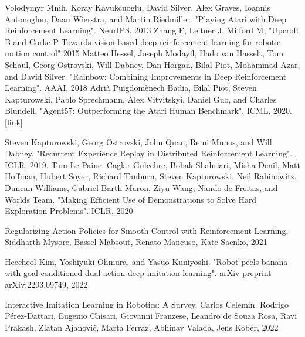 \documentclass[a4j, twocolumn, 10pt,pdflatex,ja=standard]{bxjsarticle}
\begin{document}
\begin{thebibliography}{99H}
 Volodymyr Mnih, Koray Kavukcuoglu, David Silver, Alex Graves, Ioannis Antonoglou, Daan Wierstra, and Martin Riedmiller. "Playing Atari with Deep Reinforcement Learning". NeurIPS, 2013
Zhang F, Leitner J, Milford M, "Upcroft B and Corke P Towards vision-based deep reinforcement learning for robotic motion control" 2015
 Matteo Hessel, Joseph Modayil, Hado van Hasselt, Tom Schaul, Georg Ostrovski, Will Dabney, Dan Horgan, Bilal Piot, Mohammad Azar, and David Silver. "Rainbow: Combining Improvements in Deep Reinforcement Learning". AAAI, 2018
 Adrià Puigdomènech Badia, Bilal Piot, Steven Kapturowski, Pablo Sprechmann, Alex Vitvitskyi, Daniel Guo, and Charles Blundell. "Agent57: Outperforming the Atari Human Benchmark". ICML, 2020. [link]

 Steven Kapturowski, Georg Ostrovski, John Quan, Remi Munos, and Will Dabney. "Recurrent Experience Replay in Distributed Reinforcement Learning". ICLR, 2019.
 Tom Le Paine, Caglar Gulcehre, Bobak Shahriari, Misha Denil, Matt Hoffman, Hubert Soyer, Richard Tanburn, Steven Kapturowski, Neil Rabinowitz, Duncan Williams, Gabriel Barth-Maron, Ziyu Wang, Nando de Freitas, and Worlds Team. "Making Efficient Use of Demonstrations to Solve Hard Exploration Problems". ICLR, 2020


 Regularizing Action Policies for Smooth Control with Reinforcement Learning, Siddharth Mysore, Bassel Mabsout, Renato Mancuso, Kate Saenko, 2021

 Heecheol Kim, Yoshiyuki Ohmura, and Yasuo Kuniyoshi. "Robot peels banana with goal-conditioned dual-action deep imitation learning". arXiv preprint arXiv:2203.09749, 2022.

Interactive Imitation Learning in Robotics: A Survey, Carlos Celemin, Rodrigo Pérez-Dattari, Eugenio Chisari, Giovanni Franzese, Leandro de Souza Rosa, Ravi Prakash, Zlatan Ajanović, Marta Ferraz, Abhinav Valada, Jens Kober, 2022

\end{thebibliography}
\end{document}
